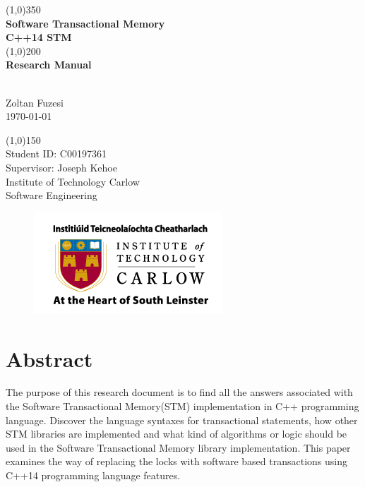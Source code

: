 \documentclass[12pt]{article}
\begin{document}
\begin{titlepage}
	\begin{center}
	\line(1,0){350}\\
	[0.3 cm]
	\huge{\textbf{Software Transactional Memory\\[0.3 cm]C++14 STM\\ }} 
	\line(1,0){200}\\
	[0.3 cm]
	\huge{\textbf{Research Manual }} 
		\begin{LARGE}
		\\[0.3 cm]Zoltan Fuzesi\\
		\today
		\end{LARGE}
		
		\begin{LARGE}
		\line(1,0){150}\\
		[1.0 cm]
		Student ID: C00197361\\
		Supervisor: Joseph Kehoe\\
		\color{gray}Institute of Technology Carlow\\
		\color{gray}Software Engineering
		\end{LARGE}
		
\begin{figure}[h!]
\centering
\includegraphics[scale=0.7]{Pictures/carlow.png}
\end{figure}
		
	\end{center}
\end{titlepage}

\tableofcontents
\clearpage
{}
\setcounter{page}{1}
\section{Abstract}
The purpose of this research document is to find all the answers associated with the Software Transactional Memory(STM) implementation in C++ programming language. Discover the language syntaxes for transactional statements, how other STM libraries are implemented and what kind of algorithms or logic  should be used in the Software Transactional Memory library implementation. This paper examines the way of replacing the locks with software based transactions using C++14 programming language features.
\end{document}
